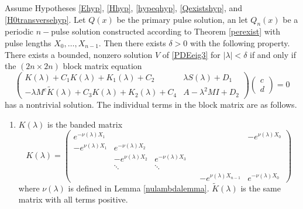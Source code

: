 \documentclass[thesis.tex]{subfiles}
\begin{document}
\begin{theorem}\label{blockmatrixtheorem}
Assume Hypotheses \ref{Ehyp}, \ref{Hhyp}, \ref{hypeqhyp}, \ref{Qexistshyp}, and \ref{H0transversehyp}. Let $Q(x)$ be the primary pulse solution, an let $Q_n(x)$ be a periodic $n-$pulse solution constructed according to Theorem \ref{perexist} with pulse lengths $X_0, \dots, X_{n-1}$. Then there exists $\delta > 0$ with the following property. There exists a bounded, nonzero solution $V$ of \eqref{PDEeig3} for $|\lambda| < \delta$ if and only if the $(2n \times 2n)$ block matrix equation
\begin{equation}\label{blockeq}
\begin{pmatrix}
K(\lambda) + C_1 K(\lambda) + K_1(\lambda) + C_2 & \lambda S(\lambda) + D_1 \\
-\lambda M^c \tilde{K}(\lambda) + C_3 K(\lambda) + K_2(\lambda) + C_4 & A - \lambda^2 MI + D_2
\end{pmatrix}
\begin{pmatrix} c \\ d \end{pmatrix} = 0
\end{equation}
has a nontrivial solution. The individual terms in the block matrix are as follows.

\begin{enumerate}
\item $K(\lambda)$ is the banded matrix
\begin{equation}
K(\lambda) = 
\begin{pmatrix}
e^{-\nu(\lambda)X_1} & & & & & -e^{\nu(\lambda)X_0} \\
-e^{\nu(\lambda)X_1} & e^{-\nu(\lambda)X_2} \\
& -e^{\nu(\lambda)X_2} & e^{-\nu(\lambda)X_3} \\
& \ddots & \ddots & &&  \\
& & & & -e^{\nu(\lambda)X_{n-1}} & e^{-\nu(\lambda)X_0} 
\end{pmatrix}
\end{equation}
where $\nu(\lambda)$ is defined in Lemma \ref{nulambdalemma}. $\tilde{K}(\lambda)$ is the same matrix with all terms positive.


\end{enumerate}
\end{theorem}
\end{document}
